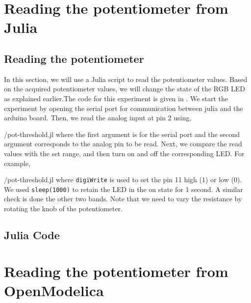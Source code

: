 \section{Reading the potentiometer from Julia}
\subsection{Reading the potentiometer}
In this section, we will use a Julia script to read the potentiometer values.  Based on the acquired potentiometer values, we will change the state of the RGB LED as explained earlier.The code for this experiment is given in
. We start the experiment by opening the serial port for communication between julia and the arduino board. Then, we read the analog input at pin 2 using,

{\LocPotjuliacode/pot-threshold.jl} where the first argument is for
the serial port and the second argument corresponds to the analog pin to be read.  Next, we compare the read values with the set range, and then turn on and off the corresponding LED. For example, 

{\LocPotjuliacode/pot-threshold.jl} where {\tt digiWrite} is used to set the pin 11 high (1) or low (0). We used {\tt sleep(1000)} to retain the LED in the on state for 1 second.  A similar check is done the other two bands. Note that we need to vary the resistance by rotating the knob of the potentiometer.

\subsection{Julia Code}
\label{sec:pot-julia-code}
\begin{juliacode}
\label{julia:pot-100}

\end{juliacode}

\section{Reading the potentiometer from OpenModelica}
